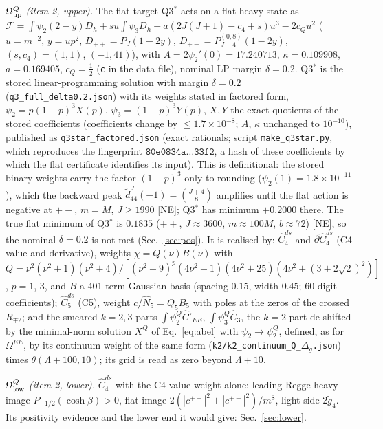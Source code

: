 \documentclass[aps,prl,onecolumn,superscriptaddress,nofootinbib]{revtex4-2}
\begin{document}
\emph{$\Omega^Q_{\rm up}$ (item 2, upper).} The flat target Q3$^*$ acts on a flat heavy state as
$\mathcal F=\int\psi_2(2-y)D_h+su\int\psi_3D_h+a(2J(J+1)-c_4+s)u^3-2c_Qu^2$ ($u=m^{-2}$, $y=up^2$,
$D_{++}=P_J(1-2y)$, $D_{+-}=P^{(0,8)}_{J-4}(1-2y)$, $(s,c_4)=(1,1)$, $(-1,41)$), with
$A=2\psi_2'(0)=17.240713$, $\kappa=0.109908$, $a=0.169405$, $c_Q=\tfrac12$ (\texttt{c} in the data file), nominal LP margin $\delta=0.2$.
Q3$^*$ is the stored linear-programming solution with margin $\delta=0.2$ (\texttt{q3\_full\_delta0.2.json}) with its weights stated in factored form, $\psi_2=p(1-p)^3X(p)$,
$\psi_3=(1-p)^3Y(p)$, $X,Y$ the exact quotients of the stored coefficients (coefficients change by
$\le1.7\times10^{-8}$; $A$, $\kappa$ unchanged to $10^{-10}$), published as \texttt{q3star\_factored.json} (exact rationals; script
\texttt{make\_q3star.py}, which reproduces the fingerprint $\texttt{80e0834a}\dots\texttt{33f2}$, a hash of these coefficients by which the flat certificate identifies its input). This is definitional: the stored binary weights carry the
factor $(1-p)^3$ only to rounding ($\psi_2(1)=1.8\times10^{-11}$), which the backward peak
$\tilde d^J_{44}(-1)=\binom{J+4}{8}$ amplifies until the flat action is negative at $+-$, $m=M$, $J\ge1990$
[NE]; Q3$^*$ has minimum $+0.2000$ there. The true flat minimum of Q3$^*$ is $0.1835$ ($++$, $J\approx3600$,
$m\approx100M$, $b\approx72$) [NE], so the nominal $\delta=0.2$ is not met (Sec.~\ref{sec:pos}). It is
realised by: $\hat C_4^{ds}$ and $\partial\hat C_4^{ds}$ (C4 value and derivative), weights $\chi=Q(\nu)B(\nu)$
with $Q=\nu^2(\nu^2+1)(\nu^2+4)/[(\nu^2+9)^p(4\nu^2+1)(4\nu^2+25)(4\nu^2+(3+2\sqrt2)^2)]$, $p=1$, $3$, and
$B$ a 401-term Gaussian basis (spacing $0.15$, width $0.45$; 60-digit coefficients); $\hat C_5^{ds}$
(C5), weight $c/\hat N_5=Q_5B_5$ with poles at the zeros of the crossed $R_{\mp2}$; and the smeared
$k=2,3$ parts $\int\psi_2^Q\hat C'_{EE}$, $\int\psi_3^Q\hat C_3$, the $k=2$ part de-shifted by the
minimal-norm solution $X^Q$ of Eq.~\eqref{eq:abel} with $\psi_2\to\psi_2^Q$, defined, as for $\Omega^{EE}$, by its continuum
weight of the same form (\texttt{k2/k2\_continuum\_Q\_}$\Delta_g$\texttt{.json}) times $\theta(\Lambda+100,10)$; its grid is read as
zero beyond $\Lambda+10$.

\emph{$\Omega^Q_{\rm low}$ (item 2, lower).} $\hat C_4^{ds}$ with the C4-value weight alone:
leading-Regge heavy image $P_{-1/2}(\cosh\beta)>0$, flat image $2(|c^{++}|^2+|c^{+-}|^2)/m^8$, light
side $2\tilde g_4$. Its positivity evidence and the lower end it would give: Sec.~\ref{sec:lower}.
\end{document}
